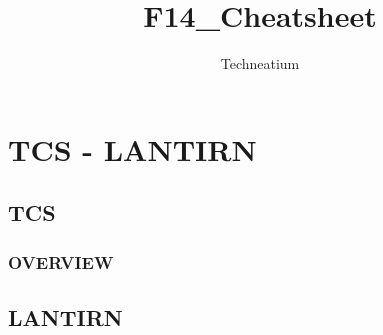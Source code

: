 \documentclass[fontSpartan]{TechCheck}
\title{F14_Cheatsheet}
\author{Techneatium}
\begin{document}
	

	\pagestyle{empty}
	\dominitoc
	\tableofcontents
	\cleardoublepage

	\setcounter{page}{1}
	\pagestyle{body}

	

	

	

	\chapter{TCS - LANTIRN}
	\minitoc
	\cleardoublepage

	\section{TCS}

	\subsection{OVERVIEW}

	\cleardoublepage

	\section{LANTIRN}
\end{document}
